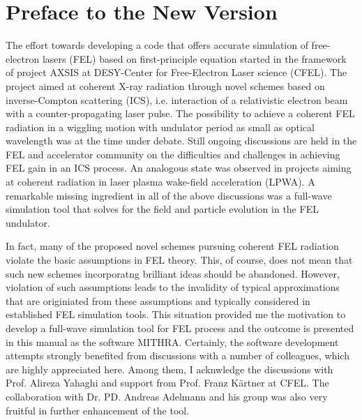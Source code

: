 \chapter{Preface to the New Version}
\label{chapter_preface}

The effort towards developing a code that offers accurate simulation of free-electron lasers (FEL) based on first-principle equation started in the framework of project AXSIS at DESY-Center for Free-Electron Laser science (CFEL).
%
The project aimed at coherent X-ray radiation through novel schemes based on inverse-Compton scattering (ICS), i.e. interaction of a relativistic electron beam with a counter-propagating laser pulse.
%
The possibility to achieve a coherent FEL radiation in a wiggling motion with undulator period as small as optical wavelength was at the time under debate.
%
Still ongoing discussions are held in the FEL and accelerator community on the difficulties and challenges in achieving FEL gain in an ICS process.
%
An analogous state was observed in projects aiming at coherent radiation in laser plasma wake-field acceleration (LPWA). 
%
A remarkable missing ingredient in all of the above discussions was a full-wave simulation tool that solves for the field and particle evolution in the FEL undulator.

In fact, many of the proposed novel schemes pursuing coherent FEL radiation violate the basic assumptions in FEL theory.
%
This, of course, does not mean that such new schemes incorporatng brilliant ideas should be abandoned.
%
However, violation of such assumptions leads to the invalidity of typical approximations that are originiated from these assumptions and typically considered in established FEL simulation tools.
%
This situation provided me the motivation to develop a full-wave simulation tool for FEL process and the outcome is presented in this manual as the software MITHRA.
%
Certainly, the software development attempts strongly benefited from discussions with a number of colleagues, which are highly appreciated here.
%
Among them, I acknwledge the discussions with Prof. Alireza Yahaghi and support from Prof. Franz K\"artner at CFEL.
%
The collaboration with Dr. PD. Andreas Adelmann and his group was also very fruitful in further enhancement of the tool.

